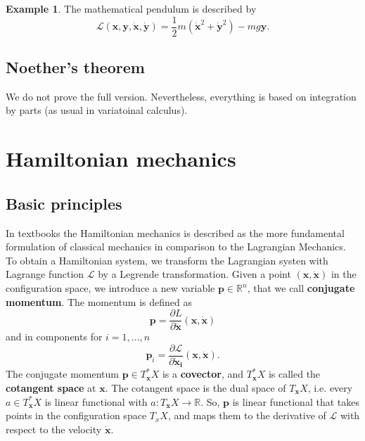 \documentclass[hidelinks,a4paper, 11pt]{article}
\theoremstyle{plain}
\theoremstyle{break}
\theoremstyle{plain}
\theoremstyle{definition}
\newtheorem*{example}{Example}
\begin{document}
{

\begin{example}
	The mathematical pendulum is described by
	\[
		\mathcal L(\mathbf x, \mathbf y, \mathbf{\dot x}, \mathbf{\dot y}) = \frac{1}{2}m(\mathbf{\dot x}^2 + \mathbf{\dot y}^2) - mg\mathbf y.
	\]
\end{example}


\subsection{Noether's theorem}

We do not prove the full version. Nevertheless, everything is based on integration by parts (as usual in variatoinal calculus).

\section{Hamiltonian mechanics}
\subsection{Basic principles}
In textbooks the Hamiltonian mechanics is described as the more fundamental formulation of classical mechanics in comparison to the Lagrangian Mechanics. To obtain a Hamiltonian system, we transform the Lagrangian systen with Lagrange function $\mathcal L$ by a Legrende transformation. Given a point $(\mathbf x, \mathbf{\dot x})$ in the configuration space, we introduce a new variable $\mathbf p \in \mathbb R^n$, that we call \textbf{conjugate momentum}. The momentum is defined as
\[
	\mathbf p = \frac{\partial L}{\partial \mathbf{\dot x}}(\mathbf x, \mathbf{\dot x})
\]
and in components for $i = 1,...,n$
\[
	\mathbf p_i = \frac{\partial \mathcal L}{\partial\mathbf{\dot x_i}}(\mathbf x, \mathbf{\dot x}).
\]
The conjugate momentum $\mathbf p \in T_{\mathbf x}^*X$ is a \textbf{covector}, and $ T_{\mathbf x}^*X$ is called the \textbf{cotangent space} at $\mathbf x$. The cotangent space is the dual space of $T_\mathbf{x}X$, i.e. every $a \in T_{\mathbf x}^*X$ is linear functional with $a: T_{\mathbf x}X \to \mathbb R$. So, $\mathbf p$ is linear functional that takes points in the configuration space $T_xX$, and maps them to the derivative of $\mathcal L$ with respect to the velocity $\mathbf{\dot x}$.

}
\end{document}

